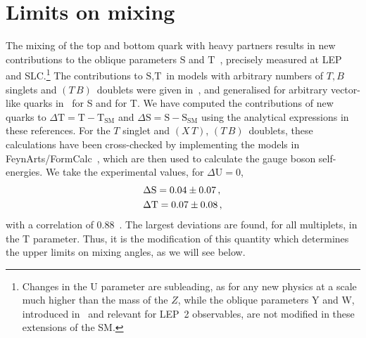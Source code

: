 \documentclass[12pt,a4paper]{article}
\newcommand{\xt}{$(X\,T)$}
\newcommand{\tb}{$(T\,B)$}
\begin{document}
\section{Limits on mixing}
\label{sec:lim}

The mixing of the top and bottom quark with heavy partners results in new contributions to the oblique parameters $\text{S}$ and $\text{T}$~\cite{Peskin:1990zt}, precisely measured at LEP and SLC.\footnote{Changes in the $\text{U}$ parameter are subleading, as for any new physics at a scale much higher than the mass of the $Z$, while the oblique parameters $\text{Y}$ and $\text{W}$, introduced in~\cite{Barbieri:2004qk} and relevant for LEP~2 observables, are not modified in these extensions of the SM.} The contributions to $\text{S},\text{T}$ in models with arbitrary numbers of $T,B$ singlets and \tb\ doublets were given in~\cite{Lavoura:1992np}, and generalised for arbitrary vector-like quarks in~\cite{Carena:2006bn} for S and \cite{Anastasiou:2009rv} for T. We have computed the contributions of new quarks to $\Delta \text{T} = \text{T}-\text{T}_\text{SM}$ and $\Delta \text{S} = \text{S}-\text{S}_\text{SM}$ using the analytical expressions in these references. For the $T$ singlet and \xt, \tb\ doublets, these calculations have been cross-checked by implementing the models in FeynArts/FormCalc~\cite{Hahn:2000kx,Hahn:1998yk}, which are then used to calculate the gauge boson self-energies. We take the experimental values, for $\Delta\text{U}=0$,
\begin{align}
& \Delta \text{S} = 0.04 \pm 0.07 \,, \notag \\
& \Delta \text{T} = 0.07 \pm 0.08 \,,
\end{align}
with a correlation of 0.88~\cite{Beringer:1900zz}. The largest deviations are found, for all multiplets, in the T parameter. Thus, it is the modification of this quantity which determines the upper limits on mixing angles, as we will see below.
\end{document}
